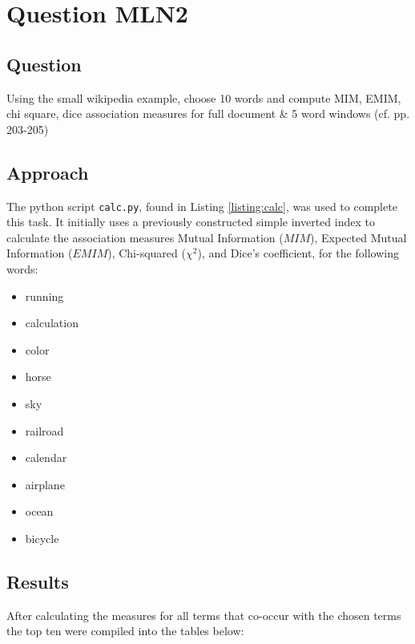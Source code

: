 \section{Question MLN2}

\subsection{Question}
Using the small wikipedia example, choose 10 words and compute MIM, EMIM, chi square, dice association measures for full document \& 5 word windows (cf. pp. 203-205)

\subsection{Approach}
The python script \texttt{calc.py}, found in Listing \ref{listing:calc}, was used to complete this task.  It initially uses a previously constructed simple inverted index to calculate the association measures Mutual Information (\(MIM\)), Expected Mutual Information (\(EMIM\)), Chi-squared (\(\chi^2\)), and Dice's coefficient, for the following words:
    
\begin{itemize}
    \item running
    \item calculation
    \item color
    \item horse
    \item sky
    \item railroad
    \item calendar
    \item airplane
    \item ocean
    \item bicycle
\end{itemize}

\subsection{Results}
After calculating the measures for all terms that co-occur with the chosen terms the top ten were compiled into the tables below:


